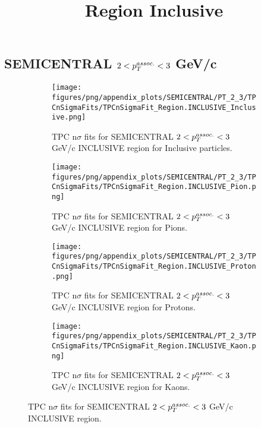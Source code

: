     
            \subsection{SEMICENTRAL $2 < \pTassoc < 3$ GeV/c}
            \begin{figure}[H]
                \title{Region Inclusive}
                \begin{subfigure}[b]{0.5\textwidth}
                    \centering
                    \texttt{[image: figures/png/appendix\_plots/SEMICENTRAL/PT\_2\_3/TPCnSigmaFits/TPCnSigmaFit\_Region.INCLUSIVE\_Inclusive.png]}
                    \caption{TPC n$\sigma$ fits for SEMICENTRAL $2 < \pTassoc < 3$ GeV/c INCLUSIVE region for Inclusive particles.}
                    \label{fig:appendix_SEMICENTRAL_$2 < \pTassoc < 3$ GeV/c_INCLUSIVE_Inclusive}
                \end{subfigure}
                \begin{subfigure}[b]{0.5\textwidth}
                    \centering
                    \texttt{[image: figures/png/appendix\_plots/SEMICENTRAL/PT\_2\_3/TPCnSigmaFits/TPCnSigmaFit\_Region.INCLUSIVE\_Pion.png]}
                    \caption{TPC n$\sigma$ fits for SEMICENTRAL $2 < \pTassoc < 3$ GeV/c INCLUSIVE region for Pions.}
                    \label{fig:appendix_SEMICENTRAL_$2 < \pTassoc < 3$ GeV/c_INCLUSIVE_Pion}
                \end{subfigure}
                \begin{subfigure}[b]{0.5\textwidth}
                    \centering
                    \texttt{[image: figures/png/appendix\_plots/SEMICENTRAL/PT\_2\_3/TPCnSigmaFits/TPCnSigmaFit\_Region.INCLUSIVE\_Proton.png]}
                    \caption{TPC n$\sigma$ fits for SEMICENTRAL $2 < \pTassoc < 3$ GeV/c INCLUSIVE region for Protons.}
                    \label{fig:appendix_SEMICENTRAL_$2 < \pTassoc < 3$ GeV/c_INCLUSIVE_Proton}
                \end{subfigure}
                \begin{subfigure}[b]{0.5\textwidth}
                    \centering
                    \texttt{[image: figures/png/appendix\_plots/SEMICENTRAL/PT\_2\_3/TPCnSigmaFits/TPCnSigmaFit\_Region.INCLUSIVE\_Kaon.png]}
                    \caption{TPC n$\sigma$ fits for SEMICENTRAL $2 < \pTassoc < 3$ GeV/c INCLUSIVE region for Kaons.}
                    \label{fig:appendix_SEMICENTRAL_$2 < \pTassoc < 3$ GeV/c_INCLUSIVE_Kaon}
                \end{subfigure}
                \caption{TPC n$\sigma$ fits for SEMICENTRAL $2 < \pTassoc < 3$ GeV/c INCLUSIVE region.}
                \label{fig:appendix_SEMICENTRAL_$2 < \pTassoc < 3$ GeV/c_INCLUSIVE}
            \end{figure}
